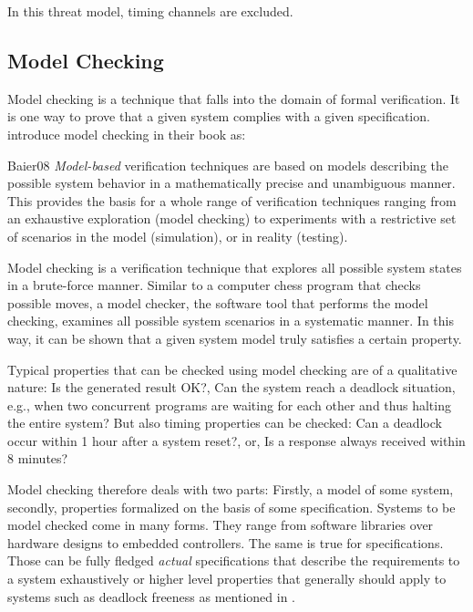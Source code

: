 In this threat model, timing channels are excluded.

\subsection{Model Checking}
\label{sec:model-checking}

Model checking is a technique that falls into the domain of formal verification.
It is one way to prove that a given system complies with a given specification.
\citeauthor{Baier08} introduce model checking in their book  \cite{Baier08} as:
\begin{displaycquote}[p.7ff.]{Baier08}
    \textit{Model-based} verification techniques are based on models describing the possible system behavior in a mathematically precise and unambiguous manner. \textelp{}
    This provides the basis for a whole range of verification techniques ranging from an exhaustive exploration (model checking) to experiments with a restrictive set of scenarios in the model (simulation), or in reality (testing). \textelp{}

    Model checking is a verification technique that explores all possible system states in a brute-force manner.
    Similar to a computer chess program that checks possible moves, a model checker, the software tool that performs the model checking, examines all possible system scenarios in a systematic manner.
    In this way, it can be shown that a given system model truly satisfies a certain property. \textelp{}

    Typical properties that can be checked using model checking are of a qualitative nature:
    Is the generated result OK?,
    Can the system reach a deadlock situation, e.g., when two concurrent programs are waiting for each other and thus halting the entire system?
    But also timing properties can be checked:
    Can a deadlock occur within 1 hour after a system reset?, or, Is a response always received within 8 minutes?
\end{displaycquote}

Model checking therefore deals with two parts: Firstly, a model of some system, secondly, properties formalized on the basis of some specification.
Systems to be model checked come in many forms.
They range from software libraries over hardware designs to embedded controllers.
The same is true for specifications.
Those can be fully fledged \textit{actual} specifications that describe the requirements to a system exhaustively or higher level properties that generally should apply to systems such as deadlock freeness as mentioned in \cite{Baier08}.

